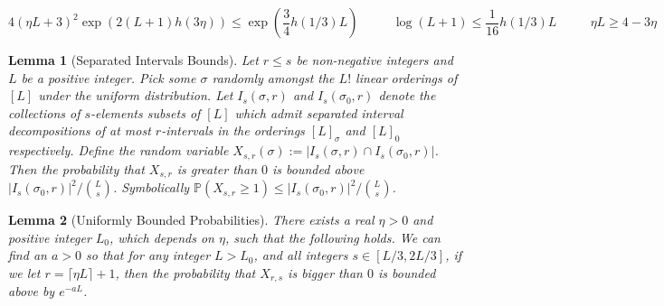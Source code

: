 \documentclass[10pt,a4paper]{amsart}
\newtheorem{lemma}{Lemma}
\newcommand{\Fpr}{\mathbb{P}}
\begin{document}
\begin{equation}
4\left(\eta L + 3\right)^{2}\exp\left(2(L+1)h(3\eta)\right) \leq \exp\left(\frac{3}{4}h(1/3)L\right) \phantom{==} \log(L+1) \leq \frac{1}{16}h(1/3)L \phantom{==} \eta L \geq 4-3\eta
\end{equation} 

\begin{lemma}[Separated Intervals Bounds]\label{lem:sepintbounds}
Let $r \leq s$ be non-negative integers and $L$ be a positive integer.  Pick some $\sigma$ randomly amongst the $L!$ linear orderings of $[L]$ under the uniform distribution.  Let $I_{s}(\sigma,r)$ and $I_{s}(\sigma_{0},r)$ denote the collections of $s$-elements subsets of $[L]$ which admit separated interval decompositions of at most $r$-intervals in the orderings $[L]_{\sigma}$ and $[L]_{0}$ respectively.  Define the random variable $X_{s,r}(\sigma) := |I_{s}(\sigma,r) \cap I_{s}(\sigma_{0},r)|$.  Then the probability that $X_{s,r}$ is greater than $0$ is bounded above $|I_{s}(\sigma_{0},r)|^{2}/\binom{L}{s}$.  Symbolically $\Fpr\left(X_{s,r} \geq 1 \right) \leq |I_{s}(\sigma_{0},r)|^{2}/\binom{L}{s}$.  
\end{lemma}

\begin{lemma}[Uniformly Bounded Probabilities]\label{lem:estimate_prob}
There exists a real $\eta > 0$ and positive integer $L_{0}$, which depends on $\eta$, such that the following holds.  We can find an $a > 0$ so that for any integer $L > L_{0}$, and all integers $s \in [L/3,2L/3]$, if we let $r = \lceil \eta L \rceil + 1$, then the probability that $X_{r,s}$ is bigger than $0$ is bounded above by $e^{-aL}$. 
\end{lemma}
\end{document}
